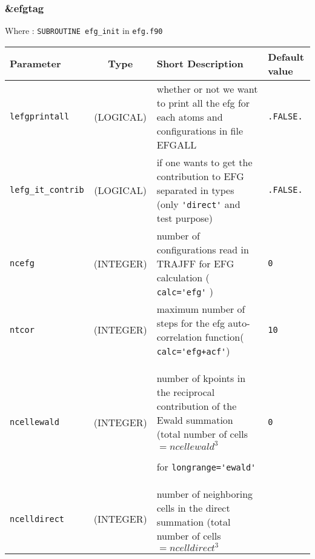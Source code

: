 \documentclass[a4paper]{article}
\begin{document}
\subsubsection{\&efgtag}

Where : \verb?SUBROUTINE efg_init? in \verb?efg.f90?
\newline

\begin{longtable}{l|c|m{8cm}|m{2cm}}
\hline
\hline
Parameter              &  Type              &          Short Description                                                          & Default value \\
\hline
\hline
\rule[-0.75cm]{0cm}{1.5cm}
\verb?lefgprintall?    & (LOGICAL)          &  whether or not we want to print all the efg for each atoms and 
                                               configurations in file EFGALL                                                      & \verb?.FALSE.? \\
\hline
\rule[-0.75cm]{0cm}{1.5cm}
\verb?lefg_it_contrib? & (LOGICAL)          & if one wants to get the contribution to EFG separated in types 
                                              (only \verb?'direct'? and test purpose)                                             & \verb?.FALSE.? \\
\hline
\rule[-0.75cm]{0cm}{1.5cm}
\verb?ncefg?           & (INTEGER)          & number of configurations read in TRAJFF for EFG calculation ( \verb?calc='efg'? )    & \verb?0? \\
\hline
\rule[-0.75cm]{0cm}{1.5cm}
\verb?ntcor?           & (INTEGER)          & maximum number of steps for the efg auto-correlation function( \verb?calc='efg+acf'?)& \verb?10? \\
\hline
\rule[-0.75cm]{0cm}{1.5cm}
\verb?ncellewald?      & (INTEGER)          & \newline number of kpoints in the reciprocal contribution of the Ewald summation
                                              (total number of cells $=ncellewald^3$ \newline
					 
                                              for \verb?longrange='ewald'?  \newline                                               & \verb?0? \\
\hline
\rule[-0.75cm]{0cm}{1.5cm}
\verb?ncelldirect?     & (INTEGER)          & \newline number of neighboring cells in the direct summation
                                              (total number of cells $=ncelldirect^3$ \newline
					 

\end{longtable}
\end{document}
